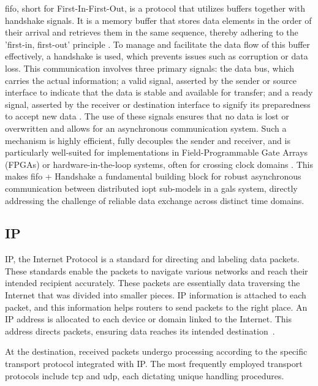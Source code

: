\gls{fifo}, short for First-In-First-Out, is a protocol that utilizes buffers together with handshake signals. It is a memory buffer that stores data elements in the order of their arrival and retrieves them in the same sequence, thereby adhering to the 'first-in, first-out' principle \cite{wakerly2006}. To manage and facilitate the data flow of this buffer effectively, a handshake is used, which prevents issues such as corruption or data loss. This communication involves three primary signals: the data bus, which carries the actual information; a valid signal, asserted by the sender or source interface to indicate that the data is stable and available for transfer; and a ready signal, asserted by the receiver or destination interface to signify its preparedness to accept new data \cite{arm_axi}. The use of these signals ensures that no data is lost or overwritten and allows for an asynchronous communication system. Such a mechanism is highly efficient, fully decouples the sender and receiver, and is particularly well-suited for implementations in Field-Programmable Gate Arrays (FPGAs) or hardware-in-the-loop systems, often for crossing clock domains \cite{bening2002}. This makes \gls{fifo} + Handshake a fundamental building block for robust asynchronous communication between distributed \gls{iopt} sub-models in a \gls{gals} system, directly addressing the challenge of reliable data exchange across distinct time domains.


\subsection{IP}
\label{sub:ip}

IP, the Internet Protocol is a standard for directing and labeling data packets. These standards enable the packets to navigate various networks and reach their intended recipient accurately. These packets are essentially data traversing the Internet that was divided into smaller pieces. IP information is attached to each packet, and this information helps routers to send packets to the right place. An IP address is allocated to each device or domain linked to the Internet. This address directs packets, ensuring data reaches its intended destination~\cite{ip2024}.

At the destination, received packets undergo processing according to the specific transport protocol integrated with IP. The most frequently employed transport protocols include \gls{tcp} and \gls{udp}, each dictating unique handling procedures.

